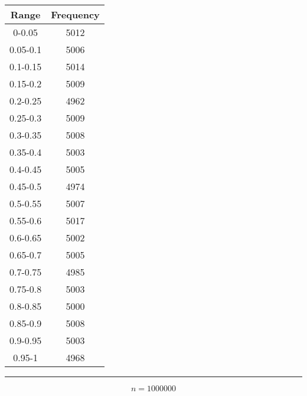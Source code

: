 \begin{center} \begin{tabular}{||c | c||}  \hline
Range & Frequency \\ [0.5ex] \hline \hline0-0.05 & 5012\\
 \hline 
0.05-0.1 & 5006\\
 \hline 
0.1-0.15 & 5014\\
 \hline 
0.15-0.2 & 5009\\
 \hline 
0.2-0.25 & 4962\\
 \hline 
0.25-0.3 & 5009\\
 \hline 
0.3-0.35 & 5008\\
 \hline 
0.35-0.4 & 5003\\
 \hline 
0.4-0.45 & 5005\\
 \hline 
0.45-0.5 & 4974\\
 \hline 
0.5-0.55 & 5007\\
 \hline 
0.55-0.6 & 5017\\
 \hline 
0.6-0.65 & 5002\\
 \hline 
0.65-0.7 & 5005\\
 \hline 
0.7-0.75 & 4985\\
 \hline 
0.75-0.8 & 5003\\
 \hline 
0.8-0.85 & 5000\\
 \hline 
0.85-0.9 & 5008\\
 \hline 
0.9-0.95 & 5003\\
 \hline 
0.95-1 & 4968\\
 \hline 
\end{tabular} 
 \end{center}

 \noindent\rule[0.5ex]{\linewidth}{1pt}



$$n= 1000000$$

